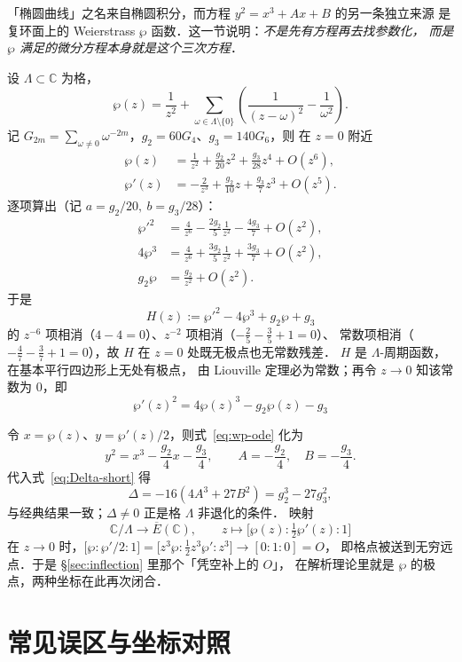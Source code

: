 \documentclass[10pt,a4paper]{article}
\numberwithin{equation}{section}
\begin{document}
「椭圆曲线」之名来自椭圆积分，而方程 $y^{2}=x^{3}+Ax+B$ 的另一条独立来源
是复环面上的 Weierstrass $\wp$ 函数．这一节说明：\emph{不是先有方程再去找参数化，
而是 $\wp$ 满足的微分方程本身就是这个三次方程}．

设 $\Lambda\subset\mathbb C$ 为格，
\[
\wp(z)=\frac{1}{z^{2}}+\sum_{\omega\in\Lambda\setminus\{0\}}
\left(\frac{1}{(z-\omega)^{2}}-\frac{1}{\omega^{2}}\right).
\]
记 $G_{2m}=\sum_{\omega\neq0}\omega^{-2m}$，$g_{2}=60G_{4}$、$g_{3}=140G_{6}$，则
在 $z=0$ 附近
\begin{align}
\wp(z)&=\frac{1}{z^{2}}+\frac{g_{2}}{20}z^{2}+\frac{g_{3}}{28}z^{4}+O(z^{6}),\\
\wp'(z)&=-\frac{2}{z^{3}}+\frac{g_{2}}{10}z+\frac{g_{3}}{7}z^{3}+O(z^{5}).
\end{align}
逐项算出（记 $a=g_{2}/20,\ b=g_{3}/28$）：
\begin{align*}
\wp'^{2}&=\frac{4}{z^{6}}-\frac{2g_{2}}{5}\frac{1}{z^{2}}-\frac{4g_{3}}{7}+O(z^{2}),\\
4\wp^{3}&=\frac{4}{z^{6}}+\frac{3g_{2}}{5}\frac{1}{z^{2}}+\frac{3g_{3}}{7}+O(z^{2}),\\
g_{2}\wp&=\frac{g_{2}}{z^{2}}+O(z^{2}).
\end{align*}
于是
\[
H(z):=\wp'^{2}-4\wp^{3}+g_{2}\wp+g_{3}
\]
的 $z^{-6}$ 项相消（$4-4=0$）、$z^{-2}$ 项相消（$-\tfrac{2}{5}-\tfrac{3}{5}+1=0$）、
常数项相消（$-\tfrac{4}{7}-\tfrac{3}{7}+1=0$），故 $H$ 在 $z=0$ 处既无极点也无常数残差．
$H$ 是 $\Lambda$-周期函数，在基本平行四边形上无处有极点，
由 Liouville 定理必为常数；再令 $z\to0$ 知该常数为 $0$，即
\begin{equation}\label{eq:wp-ode}
\boxed{\;\wp'(z)^{2}=4\wp(z)^{3}-g_{2}\wp(z)-g_{3}\;}
\end{equation}

令 $x=\wp(z)$、$y=\wp'(z)/2$，则式~\eqref{eq:wp-ode} 化为
\[
y^{2}=x^{3}-\frac{g_{2}}{4}x-\frac{g_{3}}{4},
\qquad A=-\frac{g_{2}}{4},\quad B=-\frac{g_{3}}{4}.
\]
代入式~\eqref{eq:Delta-short} 得
\[
\Delta=-16\left(4A^{3}+27B^{2}\right)=g_{2}^{3}-27g_{3}^{2},
\]
与经典结果一致；$\Delta\neq0$ 正是格 $\Lambda$ 非退化的条件．
映射
\[
\mathbb C/\Lambda\longrightarrow \overline E(\mathbb C),\qquad
z\longmapsto\bigl[\wp(z):\tfrac{1}{2}\wp'(z):1\bigr]
\]
在 $z\to0$ 时，$\bigl[\wp:\wp'/2:1\bigr]=\bigl[z^{3}\wp:\tfrac12 z^{3}\wp':z^{3}\bigr]\to[0:1:0]=O$，
即格点被送到无穷远点．于是 \S\ref{sec:inflection} 里那个「凭空补上的 $O$」，
在解析理论里就是 $\wp$ 的极点，两种坐标在此再次闭合．

\section{常见误区与坐标对照}
\end{document}
